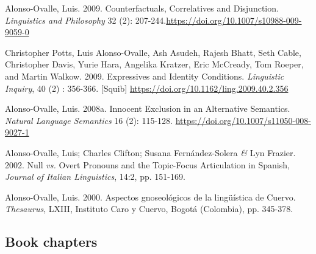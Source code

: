 \documentclass[11pt]{article}
\begin{document}
Alonso-Ovalle, Luis. 2009. Counterfactuals,
  Correlatives and Disjunction. \textit{Linguistics and Philosophy} 32 (2): 207-244.\href{https://doi.org/10.1007/s10988-009-9059-0}{https://doi.org/10.1007/s10988-009-9059-0}


Christopher Potts, Luis Alonso-Ovalle, Ash Asudeh,
    Rajesh Bhatt, Seth Cable, Christopher Davis, Yurie Hara, Angelika
    Kratzer, Eric McCready, Tom Roeper, and Martin Walkow. 2009. 
  Expressives and Identity Conditions. \textit{Linguistic Inquiry}, 40
  (2) : 356-366. [Squib] \href{ https://doi.org/10.1162/ling.2009.40.2.356}{https://doi.org/10.1162/ling.2009.40.2.356}

Alonso-Ovalle, Luis. 2008a. Innocent Exclusion in an
  Alternative Semantics. \textit{Natural Language Semantics} 16 (2):
  115-128. \href{https://doi.org/10.1007/s11050-008-9027-1}{https://doi.org/10.1007/s11050-008-9027-1} 

Alonso-Ovalle, Luis; Charles Clifton; Susana Fern\'andez-Solera \textit{\&} Lyn Frazier. 2002. Null \textit{vs.} Overt Pronouns and the Topic-Focus Articulation in Spanish, \textit{Journal of Italian Linguistics}, 14:2, pp. 151-169. 

Alonso-Ovalle, Luis. 2000. Aspectos gnoseol\'ogicos de la ling\"u\'istica de Cuervo. \textit{Thesaurus}, LXIII, Instituto Caro y Cuervo, Bogot\'a (Colombia), pp. 345-378. 



\subsection*{Book chapters} 
\end{document}
